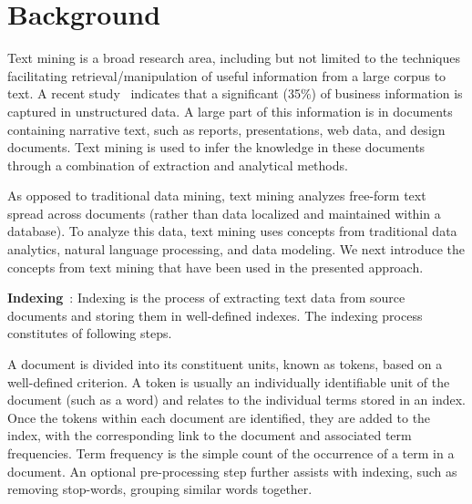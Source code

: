 \section{Background}
\label{sec:background}


Text mining is a broad research area, 
including but not limited to the techniques 
facilitating retrieval/manipulation of useful information from a large corpus to text. 
A recent study~\cite{russom2011big} indicates that 
a significant (35\%) of business information is captured in unstructured data.
A large part of this information is in 
documents containing narrative text, such as reports,
presentations, web data, and design documents.
Text mining is used to infer the knowledge
in these documents through a combination of extraction and analytical methods. 

As opposed to traditional data mining, text mining analyzes
free-form text spread across documents
(rather than data localized and maintained within a database).
To analyze this data, text mining uses concepts from traditional
data analytics, natural language processing, and data modeling.
We next introduce the concepts from text mining that have been used in the presented approach.


\textbf{Indexing}~\cite{frakes1992introduction,manning2008introduction}:
Indexing is the process of extracting text data from source documents
and storing them in well-defined indexes.
The indexing process constitutes of following steps.

A document is divided into its constituent units, known as tokens, based on a well-defined criterion. A token is usually an individually identifiable unit of the document (such as a word) and relates to the individual terms stored in an index. Once the tokens within each document are identified, they are added to the index, with the corresponding link to the document and associated term frequencies.
Term frequency is the simple count of the occurrence of a term in a document.
An optional pre-processing step further assists with indexing, such as removing stop-words, grouping similar words together. 


